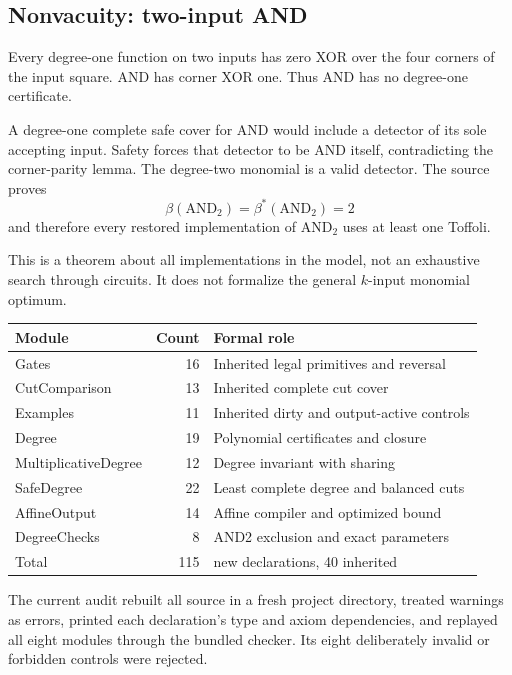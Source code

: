 \subsection*{Nonvacuity: two-input AND}
Every degree-one function on two inputs has zero XOR over the four corners of the input square. AND has corner XOR one. Thus AND has no degree-one certificate.

A degree-one complete safe cover for AND would include a detector of its sole accepting input. Safety forces that detector to be AND itself, contradicting the corner-parity lemma. The degree-two monomial is a valid detector. The source proves
\[
\beta(\mathrm{AND}_2)=\beta^*(\mathrm{AND}_2)=2
\]
and therefore every restored implementation of AND$_2$ uses at least one Toffoli.

This is a theorem about all implementations in the model, not an exhaustive search through circuits. It does not formalize the general $k$-input monomial optimum.

\begin{tabularx}{\linewidth}{@{}>{\raggedright\arraybackslash}p{1.9in}r>{\raggedright\arraybackslash}X@{}}\toprule
Module & Count & Formal role\\\midrule
Gates & 16 & Inherited legal primitives and reversal\\
CutComparison & 13 & Inherited complete cut cover\\
Examples & 11 & Inherited dirty and output-active controls\\
Degree & 19 & Polynomial certificates and closure\\
MultiplicativeDegree & 12 & Degree invariant with sharing\\
SafeDegree & 22 & Least complete degree and balanced cuts\\
AffineOutput & 14 & Affine compiler and optimized bound\\
DegreeChecks & 8 & AND2 exclusion and exact parameters\\\midrule
Total & 115 & 75 new declarations, 40 inherited\\\bottomrule
\end{tabularx}

The current audit rebuilt all source in a fresh project directory, treated warnings as errors, printed each declaration's type and axiom dependencies, and replayed all eight modules through the bundled checker. Its eight deliberately invalid or forbidden controls were rejected.

